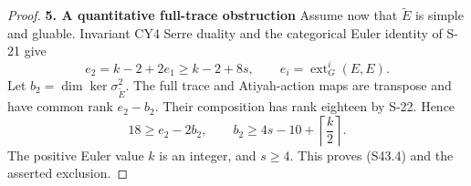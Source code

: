 \begin{proof}
\par\medskip\noindent\textbf{5. A quantitative full-trace obstruction}\quad
Assume now that $\widetilde E$ is simple and gluable.
Invariant CY4 Serre duality and the categorical Euler identity
of S-21 give
\[
 e_2=k-2+2e_1\ge k-2+8s,
 \qquad e_i=\operatorname{ext}^i_G(E,E).
\]
Let $b_2=\dim\ker\sigma^2_{\widetilde E}$. The full trace and
Atiyah-action maps are transpose and have common rank
$e_2-b_2$. Their composition has rank eighteen by S-22.
Hence
\[
 18\ge e_2-2b_2,
 \qquad
 b_2\ge4s-10+\left\lceil\frac{k}{2}\right\rceil.
\]
The positive Euler value $k$ is an integer, and $s\ge4$.
This proves (S43.4) and the asserted exclusion.
\end{proof}
